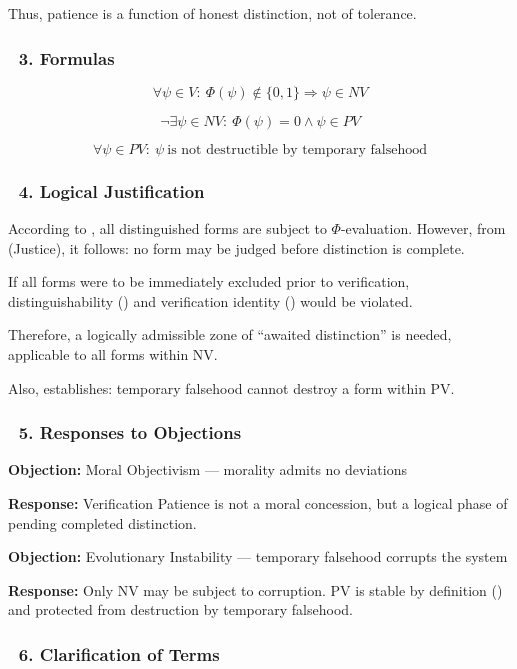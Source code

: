\documentclass[12pt]{article}
\begin{document}
Thus, patience is a function of honest distinction, not of tolerance.

\subsubsection*{🔹 3. Formulas}

\[
\forall \psi \in V:\ \Phi(\psi) \notin \{0,1\} \Rightarrow \psi \in NV
\]

\[
\neg \exists \psi \in NV:\ \Phi(\psi) = 0 \land \psi \in PV
\]

\[
\forall \psi \in PV:\ \psi\ \text{is not destructible by temporary falsehood}
\]

\subsubsection*{🔹 4. Logical Justification}

According to \text{[11.6]}, all distinguished forms are subject to $\Phi$-evaluation. However, from \text{[11.7]} (Justice), it follows: no form may be judged before distinction is complete.

If all forms were to be immediately excluded prior to verification, distinguishability (\text{[5]}) and verification identity (\text{[9.2]}) would be violated.

Therefore, a logically admissible zone of ``awaited distinction'' is needed, applicable to all forms within \text{[4.3]} NV.

Also, \text{[11.2.1]} establishes: temporary falsehood cannot destroy a form within \text{[4.4]} PV.

\subsubsection*{🔹 5. Responses to Objections}

\textbf{Objection:} Moral Objectivism — morality admits no deviations

\textbf{Response:} Verification Patience is not a moral concession, but a logical phase of pending completed distinction.

\bigskip

\textbf{Objection:} Evolutionary Instability — temporary falsehood corrupts the system

\textbf{Response:} Only NV may be subject to corruption. PV is stable by definition (\text{[4.4]}) and protected from destruction by temporary falsehood.

\subsubsection*{🔹 6. Clarification of Terms}
\end{document}
